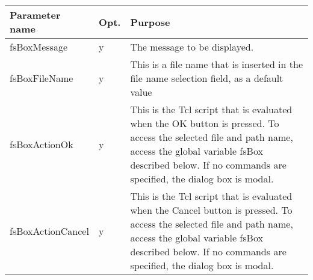 {\newpage
\clearpage
\samepage \begin{tabular}{|l|l|p{6.5cm}|} \hline
Parameter name    & Opt. & Purpose \\  \hline
fsBoxMessage      & y    & The message to be displayed. \\  \hline
fsBoxFileName     & y    & This is a file name that is
                           inserted in the file name
                           selection field, as a default
                           value \\  \hline
fsBoxActionOk     & y    & This is the Tcl script that is
                           evaluated when the OK button is
                           pressed. To access the selected
                           file and path name, access the
                           global variable fsBox described
                           below. If no commands are
                           specified, the dialog box is
                           modal.\\  \hline
fsBoxActionCancel & y    & This is the Tcl script that is
                           evaluated when the Cancel button
                           is pressed. To access the
                           selected file and path name,
                           access the global variable fsBox
                           described below. If no commands
                           are specified, the dialog box is
                           modal.\\  \hline
\end{tabular}
}

